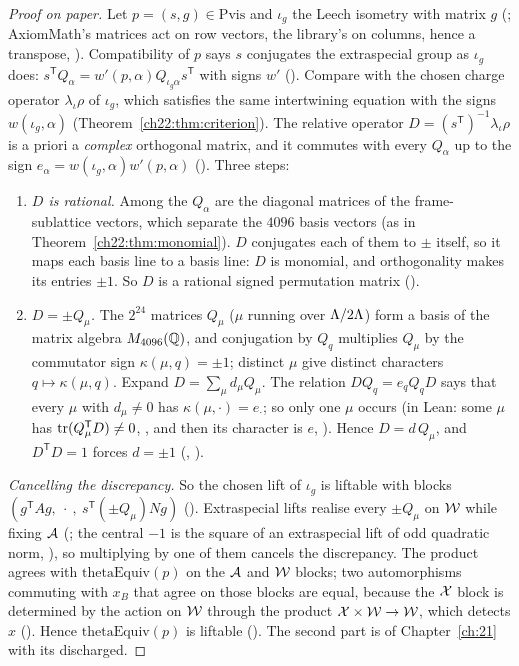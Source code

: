 \begin{proof}[Proof on paper]
Let $p=(s,g)\in\mathrm{Pvis}$ and $\iota_g$ the Leech isometry with matrix $g$ (; AxiomMath's
matrices act on row vectors, the library's on columns, hence a transpose, ).  Compatibility of
$p$ says $s$ conjugates the extraspecial group as $\iota_g$ does: $s^{\mathsf T}Q_\alpha=w'(p,\alpha)Q_{\iota_g\alpha}s^{\mathsf T}$ with
signs $w'$ ().  Compare with the chosen charge operator $\lambda_\iota\rho$ of $\iota_g$, which satisfies the same intertwining
equation with the signs $w(\iota_g,\alpha)$ (Theorem~\ref{ch22:thm:criterion}).  The relative operator
$D=(s^{\mathsf T})^{-1}\lambda_\iota\rho$ is a priori a \emph{complex} orthogonal matrix, and it commutes with every $Q_\alpha$
up to the sign $e_\alpha=w(\iota_g,\alpha)w'(p,\alpha)$ ().  Three steps:
\begin{enumerate}[label=(\roman*)]
\item \emph{$D$ is rational.}  Among the $Q_\alpha$ are the diagonal matrices of the frame-sublattice vectors, which separate
  the $4096$ basis vectors (as in Theorem~\ref{ch22:thm:monomial}).  $D$ conjugates each of them to $\pm$ itself, so it maps
  each basis line to a basis line: $D$ is monomial, and orthogonality makes its entries $\pm1$.  So $D$ is a rational signed
  permutation matrix ().
\item \emph{$D=\pm Q_\mu$.}  The $2^{24}$ matrices $Q_\mu$ ($\mu$ running over ${\Lambda}/2{\Lambda}$) form a basis of the
  matrix algebra $M_{4096}({\mathbb{Q}})$, and conjugation by $Q_q$ multiplies $Q_\mu$ by the commutator sign $\kappa(\mu,q)=\pm1$;
  distinct $\mu$ give distinct characters $q\mapsto\kappa(\mu,q)$.  Expand $D=\sum_\mu d_\mu Q_\mu$.  The relation
  $DQ_q=e_qQ_qD$ says that every $\mu$ with $d_\mu\ne0$ has $\kappa(\mu,\cdot)=e_\cdot$; so only one $\mu$ occurs (in Lean:
  some $\mu$ has $\operatorname{tr}(Q_\mu^{\mathsf T}D)\ne0$, , and then its character is $e$,
  ).  Hence $D=d\,Q_\mu$, and $D^{\mathsf T}D=1$ forces $d=\pm1$ (,
  ).
\end{enumerate}
\emph{Cancelling the discrepancy.}  So the chosen lift of $\iota_g$ is liftable with blocks
$(g^{\mathsf T}Ag,\ \cdot\ ,\ s^{\mathsf T}(\pm Q_\mu)Ng)$ ().  Extraspecial lifts realise every
$\pm Q_\mu$ on $\mathcal{W}$ while fixing $\mathcal{A}$ (; the central $-1$ is the square of an
extraspecial lift of odd quadratic norm, ), so multiplying by one of them cancels the discrepancy.
The product agrees with $\mathrm{thetaEquiv}(p)$ on the $\mathcal{A}$ and $\mathcal{W}$ blocks; two automorphisms
commuting with $x_B$ that agree on those blocks are equal, because the $\mathcal{X}$ block is determined by the action on
$\mathcal{W}$ through the product $\mathcal{X}\times\mathcal{W}\to\mathcal{W}$, which detects $x$
().  Hence $\mathrm{thetaEquiv}(p)$ is liftable ().  The second part is
 of Chapter~\ref{ch:21} with its  discharged.
\end{proof}
